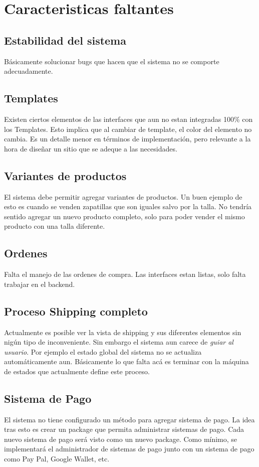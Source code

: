 \chapter{Caracteristicas faltantes}

	\section{Estabilidad del sistema}
		Básicamente solucionar bugs que hacen que el sistema no se comporte adecuadamente.

	\section{Templates}
		Existen ciertos elementos de las interfaces que aun no estan integradas 100\%  con los Templates. Esto implica que al cambiar de template, el color del elemento no cambia.
		Es un detalle menor en términos de implementación, pero relevante a la hora de diseñar un sitio \ecommerceCOM que se adeque a las necesidades.

	\section{Variantes de productos}
		El sistema debe permitir agregar variantes de productos. Un buen ejemplo de esto es cuando se venden zapatillas que son iguales salvo por la talla. No tendría sentido agregar un nuevo producto completo, solo para poder vender el mismo producto con una talla diferente.

	\section{Ordenes}
		Falta el manejo de las ordenes de compra. Las interfaces estan listas, solo falta trabajar en el backend.

	\section{Proceso Shipping completo}
		Actualmente es posible ver la vista de shipping y sus diferentes elementos sin nigún tipo de inconveniente. Sin embargo el sistema aun carece de \textit{guiar al usuario}. Por ejemplo el estado global del sistema no se actualiza automáticamente aun.
		Básicamente lo que falta acá es terminar con la máquina de estados que actualmente define este proceso.

	\section{Sistema de Pago}
		El sistema no tiene configurado un método para agregar sistema de pago. La idea tras esto es crear un package que permita administrar sistemas de pago. Cada nuevo sistema de pago será visto como un nuevo package.
		Como mínimo, se implementará el administrador de sistemas de pago junto con un sistema de pago como Pay Pal, Google Wallet, etc.

